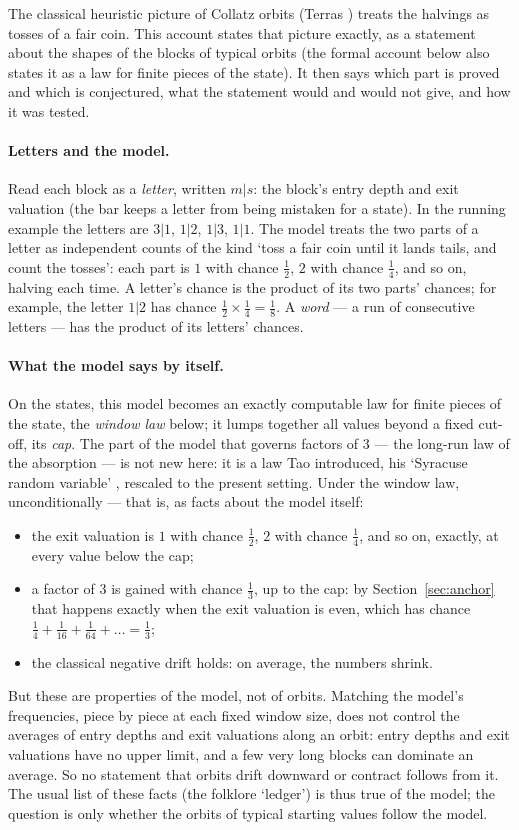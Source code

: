 \documentclass[11pt]{article}
\theoremstyle{remark}
\begin{document}
The classical heuristic picture of Collatz orbits (Terras \cite{terras}) treats the halvings as tosses of a fair coin. This account states that picture exactly, as a statement about the shapes of the blocks of typical orbits (the formal account below also states it as a law for finite pieces of the state). It then says which part is proved and which is conjectured, what the statement would and would not give, and how it was tested.

\paragraph{Letters and the model.} Read each block as a \emph{letter}, written $m|s$: the block's entry depth and exit valuation (the bar keeps a letter from being mistaken for a state). In the running example the letters are $3|1$, $1|2$, $1|3$, $1|1$. The model treats the two parts of a letter as independent counts of the kind `toss a fair coin until it lands tails, and count the tosses': each part is $1$ with chance $\tfrac12$, $2$ with chance $\tfrac14$, and so on, halving each time. A letter's chance is the product of its two parts' chances; for example, the letter $1|2$ has chance $\tfrac12 \times \tfrac14 = \tfrac18$. A \emph{word} --- a run of consecutive letters --- has the product of its letters' chances.

\paragraph{What the model says by itself.} On the states, this model becomes an exactly computable law for finite pieces of the state, the \emph{window law} below; it lumps together all values beyond a fixed cut-off, its \emph{cap}. The part of the model that governs factors of $3$ --- the long-run law of the absorption --- is not new here: it is a law Tao introduced, his `Syracuse random variable' \cite{tao}, rescaled to the present setting. Under the window law, unconditionally --- that is, as facts about the model itself:
\begin{itemize}
\item the exit valuation is $1$ with chance $\tfrac12$, $2$ with chance $\tfrac14$, and so on, exactly, at every value below the cap;
\item a factor of $3$ is gained with chance $\tfrac13$, up to the cap: by Section~\ref{sec:anchor} that happens exactly when the exit valuation is even, which has chance $\tfrac14 + \tfrac1{16} + \tfrac1{64} + \dots = \tfrac13$;
\item the classical negative drift holds: on average, the numbers shrink.
\end{itemize}
But these are properties of the model, not of orbits. Matching the model's frequencies, piece by piece at each fixed window size, does not control the averages of entry depths and exit valuations along an orbit: entry depths and exit valuations have no upper limit, and a few very long blocks can dominate an average. So no statement that orbits drift downward or contract follows from it. The usual list of these facts (the folklore `ledger') is thus true of the model; the question is only whether the orbits of typical starting values follow the model.
\end{document}
